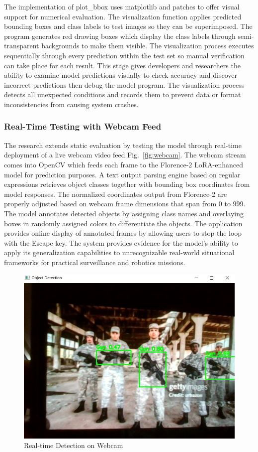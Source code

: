 \documentclass[fleqn,10pt,lineno]{wlpeerj}
\begin{document}
The implementation of plot\_bbox uses matplotlib and patches to offer visual support for numerical evaluation. The visualization function applies predicted bounding boxes and class labels to test images so they can be superimposed. The program generates red drawing boxes which display the class labels through semi-transparent backgrounds to make them visible. The visualization process executes sequentially through every prediction within the test set so manual verification can take place for each result. This stage gives developers and researchers the ability to examine model predictions visually to check accuracy and discover incorrect predictions then debug the model program. The visualization process detects all unexpected conditions and records them to prevent data or format inconsistencies from causing system crashes. 

\subsubsection{Real-Time Testing with Webcam Feed}

The research extends static evaluation by testing the model through real-time deployment of a live webcam video feed Fig.~\ref{fig:webcam}. The webcam stream comes into OpenCV which feeds each frame to the Florence-2 LoRA-enhanced model for prediction purposes. A text output parsing engine based on regular expressions retrieves object classes together with bounding box coordinates from model responses. The normalized coordinates output from Florence-2 are properly adjusted based on webcam frame dimensions that span from 0 to 999. The model annotates detected objects by assigning class names and overlaying boxes in randomly assigned colors to differentiate the objects. The application provides online display of annotated frames by allowing users to stop the loop with the Escape key. The system provides evidence for the model’s ability to apply its generalization capabilities to unrecognizable real-world situational frameworks for practical surveillance and robotics missions. 

\begin{figure}[H]
    \centering
    \includegraphics[width=0.5\linewidth]{webcam_result2.png}
    \caption{Real-time Detection on Webcam}
\end{figure}
\end{document}
